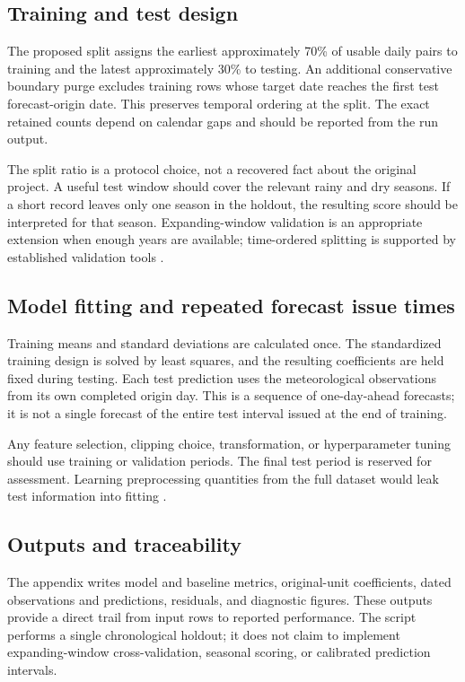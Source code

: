 \documentclass[11pt,a4paper]{article}
\begin{document}
\subsection{Training and test design}
The proposed split assigns the earliest approximately 70\% of usable daily pairs to training and the latest approximately 30\% to testing. An additional conservative boundary purge excludes training rows whose target date reaches the first test forecast-origin date. This preserves temporal ordering at the split. The exact retained counts depend on calendar gaps and should be reported from the run output.

The split ratio is a protocol choice, not a recovered fact about the original project. A useful test window should cover the relevant rainy and dry seasons. If a short record leaves only one season in the holdout, the resulting score should be interpreted for that season. Expanding-window validation is an appropriate extension when enough years are available; time-ordered splitting is supported by established validation tools \cite{timesplit}.

\subsection{Model fitting and repeated forecast issue times}
Training means and standard deviations are calculated once. The standardized training design is solved by least squares, and the resulting coefficients are held fixed during testing. Each test prediction uses the meteorological observations from its own completed origin day. This is a sequence of one-day-ahead forecasts; it is not a single forecast of the entire test interval issued at the end of training.

Any feature selection, clipping choice, transformation, or hyperparameter tuning should use training or validation periods. The final test period is reserved for assessment. Learning preprocessing quantities from the full dataset would leak test information into fitting \cite{pitfalls}.

\subsection{Outputs and traceability}
The appendix writes model and baseline metrics, original-unit coefficients, dated observations and predictions, residuals, and diagnostic figures. These outputs provide a direct trail from input rows to reported performance. The script performs a single chronological holdout; it does not claim to implement expanding-window cross-validation, seasonal scoring, or calibrated prediction intervals.
\end{document}
